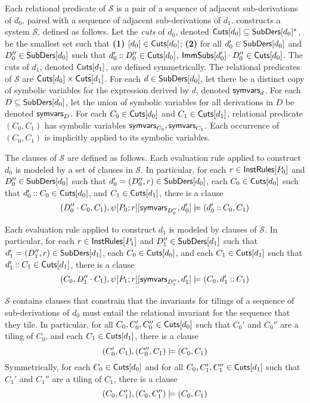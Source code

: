 Each relational predicate of $\mathcal{S}$ is a pair of a sequence of
adjacent sub-derivations of $d_0$, paired with a sequence of adjacent
sub-derivations of $d_1$.
\verifyders constructs a system $\mathcal{S}$, defined as follows.
%
Let the \emph{cuts} of $d_0$, denoted $\mathsf{Cuts}[ d_0 ] \subseteq
\mathsf{SubDers}[ d_0 ]^{*}$, be the smallest set such that %
\textbf{(1)} $[ d_0 ] \in \mathsf{Cuts}[ d_0 ]$; %
\textbf{(2)} for all $d_0' \in \mathsf{SubDers}[ d_0 ]$ and $D_0'' \in
\mathsf{SubDers}[ d_0 ]$ such that $d_0' \mathbin{::} D_0'' \in \mathsf{Cuts}[ d_0 ]$,
$\mathsf{ImmSubs}[ d_0' ] \cdot D_0'' \in \mathsf{Cuts}[ d_0 ]$.
%
The cuts of $d_1$, denoted $\mathsf{Cuts}[ d_1 ]$, are defined symmetrically.
The relational predicates of $\mathcal{S}$ are $\mathsf{Cuts}[ d_0 ] \times
\mathsf{Cuts}[ d_1 ]$.
%
For each $d \in \mathsf{SubDers}[ d_0 ]$, let there be a distinct copy of
symbolic variables for the expression derived by $d$, denoted
$\mathsf{symvars}_{d}$.
%
For each $D \subseteq \mathsf{SubDers}[ d_0 ]$, let the union of symbolic
variables for all derivations in $D$ be denoted $\mathsf{symvars}_{D}$.
%
For each $C_0 \in \mathsf{Cuts}[ d_0 ]$ and $C_1 \in \mathsf{Cuts}[ d_1 ]$, relational
predicate $(C_0, C_1)$ has symbolic variables $\mathsf{symvars}_{C_0},
\mathsf{symvars}_{C_1}$.
%
Each occurrence of $(C_0, C_1)$ is implicitly applied to its symbolic
variables.

The clauses of $\mathcal{S}$ are defined as follows.
%
Each evaluation rule applied to construct $d_0$ is modeled by a set of
clauses in $\mathcal{S}$.
In particular, for each $r \in \mathsf{InstRules}[ P_0 ]$ and $D_0'' \in
\mathsf{SubDers}[  d_0  ]$ such that $d_0' = (D_0'', r) \in \mathsf{SubDers}[  d_0  ]$, %
each $C_0 \in \mathsf{Cuts}[ d_0 ]$ such that $d_0' \mathbin{::} C_0 \in \mathsf{Cuts}[  d_0  ]$,
and %
$C_1 \in \mathsf{Cuts}[  d_1  ]$, there is a clause %
\[ (D_0'' \concat C_0, C_1), %
\symstep{ P_0 }{ r }[ \symvars{ D_0'' }, d_0' ] \entails %
(d_0' \cons C_0, C_1) \]

Each evaluation rule applied to construct $d_1$ is modeled by clauses
of $\mathcal{S}$.
%
In particular, for each $r \in \mathsf{InstRules}[ P_1 ]$ and $D_1'' \in
\mathsf{SubDers}[ d_1 ]$ such that $d_1' = (D_1'', r) \in \mathsf{SubDers}[  d_1  ]$, %
each $C_0 \in \mathsf{Cuts}[ d_0 ]$, and %
each $C_1 \in \mathsf{Cuts}[  d_1  ]$ such that $d_1' \mathbin{::} C_1 \in \mathsf{Cuts}[ d_1 ]$,
there is a clause
\[ (C_0, D_1'' \concat C_1), %
\symstep{ P_1 }{ r }[ \symvars{ D_1'' }, d_1' ] \entails %
(C_0, d_1' \cons C_1) \]

$\mathcal{S}$ contains clauses that constrain that the invariants for
tilings of a sequence of sub-derivations of $d_0$ must entail the
relational invariant for the sequence that they tile.
%
In particular, for all $C_0, C_0', C_0'' \in \mathsf{Cuts}[ d_0 ]$ such that
$C_0'$ and $C_0''$ are a tiling of $C_0$, and %
each $C_1 \in \mathsf{Cuts}[ d_1 ]$, there is a clause
\[ (C_0', C_1), (C_0'', C_1) \models (C_0, C_1)
\]
%
Symmetrically, for each $C_0 \in \mathsf{Cuts}[ d_0 ]$ and %
for all $C_0, C_1', C_1'' \in \mathsf{Cuts}[ d_1 ]$ such that $C_1'$ and $C_1''$
are a tiling of $C_1$, %
there is a clause 
\[ (C_0, C_1'), (C_0, C_1'') \models (C_0, C_1)
\]

